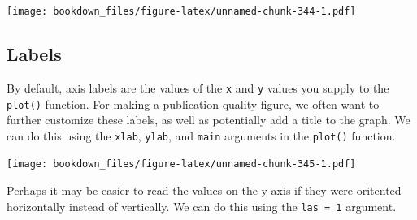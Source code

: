 \documentclass[
]{krantz}
\makeatletter
\newenvironment{Shaded}{\begin{snugshade}}{\end{snugshade}}
\newcommand{\DataTypeTok}[1]{\textcolor[rgb]{0.27,0.27,0.27}{#1}}
\newcommand{\DecValTok}[1]{\textcolor[rgb]{0.06,0.06,0.06}{#1}}
\newcommand{\KeywordTok}[1]{\textcolor[rgb]{0.27,0.27,0.27}{\textbf{#1}}}
\newcommand{\NormalTok}[1]{#1}
\newcommand{\OperatorTok}[1]{\textcolor[rgb]{0.43,0.43,0.43}{\textbf{#1}}}
\newcommand{\StringTok}[1]{\textcolor[rgb]{0.5,0.5,0.5}{#1}}
\newenvironment{kframe}{%
\medskip{}
\setlength{\fboxsep}{.8em}
 \def\at@end@of@kframe{}%
 \ifinner\ifhmode%
  \def\at@end@of@kframe{\end{minipage}}%
  \begin{minipage}{\columnwidth}%
 \fi\fi%
 \def\FrameCommand##1{\hskip\@totalleftmargin \hskip-\fboxsep
 \colorbox{shadecolor}{##1}\hskip-\fboxsep
     \hskip-\linewidth \hskip-\@totalleftmargin \hskip\columnwidth}%
 \MakeFramed {\advance\hsize-\width
   \@totalleftmargin\z@ \linewidth\hsize
   \@setminipage}}%
 {\par\unskip\endMakeFramed%
 \at@end@of@kframe}
\renewenvironment{Shaded}{\begin{kframe}}{\end{kframe}}
\makeatother
\begin{document}
\begin{Shaded}
\end{Shaded}

\texttt{[image: bookdown\_files/figure-latex/unnamed-chunk-344-1.pdf]}

\hypertarget{labels-1}{%
\subsection{Labels}\label{labels-1}}

By default, axis labels are the values of the \texttt{x} and \texttt{y} values you supply to the \texttt{plot()} function. For making a publication-quality figure, we often want to further customize these labels, as well as potentially add a title to the graph. We can do this using the \texttt{xlab}, \texttt{ylab}, and \texttt{main} arguments in the \texttt{plot()} function.

\begin{Shaded}
\end{Shaded}

\texttt{[image: bookdown\_files/figure-latex/unnamed-chunk-345-1.pdf]}

Perhaps it may be easier to read the values on the y-axis if they were oritented horizontally instead of vertically. We can do this using the \texttt{las\ =\ 1} argument.
\end{document}
